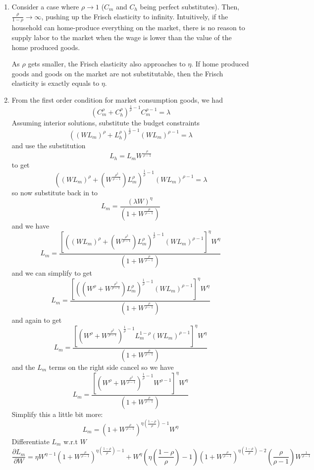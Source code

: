 \documentclass[11pt]{amsart}
\begin{document}
\begin{enumerate}[label = (\alph*)]
	\item Consider a case where $\rho \rightarrow 1$ ($C_m$ and $C_h$ being perfect substitutes). Then, $\frac{\rho}{1 - \rho} \rightarrow \infty$, pushing up the Frisch elasticity to infinity. Intuitively, if the household can home-produce everything on the market, there is no reason to supply labor to the market when the wage is lower than the value of the home produced goods. 
	
	As $\rho$ gets smaller, the Frisch elasticity also approaches to $\eta$. If home produced goods and goods on the market are not substitutable, then the Frisch elasticity is exactly equals to $\eta$. 
	
	\item
	From the first order condition for market consumption goods, we had
	\[
	\left( C_m^\rho + C_h^\rho \right)^{\frac{1}{\rho} -1}  C_m^{\rho-1} = \lambda
	\]
	Assuming interior solutions, substitute the budget constraints
	\[
	((W L_m)^{\rho} + L_h^{\rho})^{\frac{1}{\rho} -1} (W L_m)^{\rho-1} = \lambda
	\]
	and use the substitution
	\[
	L_h = L_m W^{\frac{\rho}{\rho-1}}
	\]
	to get
	\[
	((W L_m)^{\rho} + ( W^{\frac{\rho^2}{\rho-1}}) L_m^{\rho})^{\frac{1}{\rho} -1} (W L_m)^{\rho-1} = \lambda
	\]
	so now substitute back in to
	\[
	L_m = \frac{(\lambda W)^{\eta}}{(1 + W^{\frac{\rho}{\rho-1}})}
	\]
	and we have
	\[
	L_m = \frac{ \left[((W L_m)^{\rho} + ( W^{\frac{\rho^2}{\rho-1}}) L_m^{\rho})^{\frac{1}{\rho} -1} (W L_m)^{\rho-1}\right]^{\eta} W^{\eta}}{(1 + W^{\frac{\rho}{\rho-1}})}
	\]
	and we can simplify to get
	\[
	L_m = \frac{ \left[((W^{\rho} + W^{\frac{\rho^2}{\rho-1}}) L_m^{\rho})^{\frac{1}{\rho} -1} (W L_m)^{\rho-1}\right]^{\eta} W^{\eta}}{(1 + W^{\frac{\rho}{\rho-1}})}
	\]
	and again to get
	\[
	L_m = \frac{ \left[(W^{\rho} + W^{\frac{\rho^2}{\rho-1}})^{\frac{1}{\rho} -1} L_m^{1-\rho} (W L_m)^{\rho-1}\right]^{\eta} W^{\eta}}{(1 + W^{\frac{\rho}{\rho-1}})}
	\]
	and the $L_m$ terms on the right side cancel so we have
	\[
	L_m = \frac{ \left[(W^{\rho} + W^{\frac{\rho^2}{\rho-1}})^{\frac{1}{\rho} -1}  W ^{\rho-1}\right]^{\eta} W^{\eta}}{(1 + W^{\frac{\rho}{\rho-1}})}
	\]
	Simplify this a little bit more:
	\begin{equation*}
	L_m = \left( 1 + W^{\frac{\rho}{\rho-1}} \right)^{\eta \left( \frac{1-\rho}{\rho} \right) -1} W^\eta
	\end{equation*}
	Differentiate $L_m$ w.r.t $W$
	\begin{dmath*}
	\frac{\partial L_m}{\partial W} = \eta W^{\eta -1 } \left( 1 + W^{\frac{\rho}{\rho-1}} \right)^{\eta \left( \frac{1-\rho}{\rho} \right) -1} + W^\eta \left( \eta \left( \frac{1-\rho}{\rho} \right) -1  \right)  \left( 1 + W^{\frac{\rho}{\rho-1}} \right)^{\eta \left( \frac{1-\rho}{\rho} \right) -2} \left( \frac{\rho}{\rho-1} \right) W^{\frac{1}{\rho-1}}

\end{dmath*}
\end{enumerate}
\end{document}
